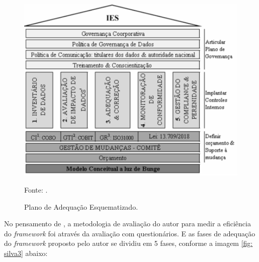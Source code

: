 \documentclass[
	12pt,				%
	openright,			%
	oneside,			%
	a4paper,			%
	english,			%
	french,				%
	spanish,			%
	brazil,				%
	]{abntex2}
\begin{document}
\begin{figure}[ht]
    \centering
    \caption{Plano de Adequação Esquematizado.}
    \includegraphics[width=6.0in]{Images/13Silva2020.png}
    \label{fig: silva2}
    
    \centering \small Fonte: \cite{Silva2020}.
\end{figure}

No pensamento de \cite{Silva2020}, a metodologia de avaliação do autor para medir a eficiência do \textit{framework}  foi através da avaliação com questionários. E as fases de adequação do \textit{framework}  proposto pelo autor se dividiu em 5 fases, conforme a imagem \ref{fig: silva3} abaixo: 
\pagebreak
\end{document}
